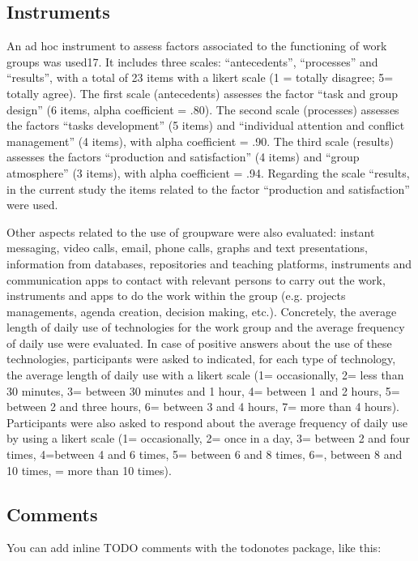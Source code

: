 \documentclass[a4paper,man,natbib]{apa6}
\begin{document}
\subsection{Instruments}

An ad hoc instrument to assess factors associated to the functioning of work groups was used17. It includes three scales: “antecedents”, “processes” and “results”, with a total of 23 items with a likert scale (1 = totally disagree; 5= totally agree). The first scale (antecedents) assesses the factor “task and group design” (6 items, alpha coefficient = .80). The second scale (processes) assesses the factors “tasks development” (5 items) and “individual attention and conflict management” (4 items), with alpha coefficient = .90. The third scale (results) assesses the factors “production and satisfaction” (4 items) and “group atmosphere” (3 items), with alpha coefficient = .94. Regarding the scale “results, in the current study the items related to the factor “production and satisfaction” were used.

Other aspects related to the use of groupware were also evaluated: instant messaging, video calls, email, phone calls, graphs and text presentations, information from databases, repositories and teaching platforms, instruments and communication apps to contact with relevant persons to carry out the work, instruments and apps to do the work within the group (e.g. projects managements, agenda creation, decision making, etc.). Concretely, the average length of daily use of technologies for the work group and the average frequency of daily use were evaluated. In case of positive answers about the use of these technologies, participants were asked to indicated, for each type of technology, the average length of daily use with a likert scale (1= occasionally, 2= less than 30 minutes, 3= between 30 minutes and 1 hour, 4= between 1 and 2 hours, 5= between 2 and three hours, 6= between 3 and 4 hours, 7= more than 4 hours). Participants were also asked to respond about the average frequency of daily use by using a likert scale (1= occasionally, 2= once in a day, 3= between 2 and four times, 4=between 4 and 6 times, 5= between 6 and 8 times, 6=, between 8 and 10 times, = more than 10 times). 


\subsection{Comments}

You can add inline TODO comments with the todonotes package, like this:
\end{document}
